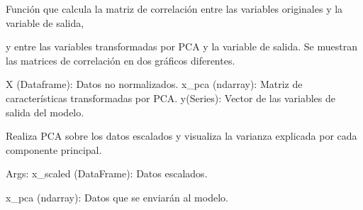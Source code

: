 \documentclass[letterpaper,10pt,spanish]{sphinxmanual}
\begin{document}
\label{\detokenize{Funciones_Visualizacion:module-Matriz_correlacion}}

\begin{fulllineitems}
\label{\detokenize{Funciones_Visualizacion:Matriz_correlacion.Variables_correlacion}}
\pysigstartsignatures
\pysiglinewithargsret
{}
{\sphinxparamcomma {}\sphinxparamcomma {}}
{}
\pysigstopsignatures
\sphinxAtStartPar
Función que calcula la matriz de correlación entre las variables originales y la variable de salida,

\sphinxAtStartPar
y entre las variables transformadas por PCA y la variable de salida.
Se muestran las matrices de correlación en dos gráficos diferentes.
\begin{description}
\sphinxAtStartPar
X (Dataframe): Datos no normalizados.
x\_pca (ndarray): Matriz de características transformadas por PCA.
y(Series): Vector de las variables de salida del modelo.

\end{description}

\end{fulllineitems}

\label{\detokenize{Funciones_Visualizacion:module-Principales_caracteristicas}}

\begin{fulllineitems}
\label{\detokenize{Funciones_Visualizacion:Principales_caracteristicas.pca}}
\pysigstartsignatures
\pysiglinewithargsret
{}
{}
{}
\pysigstopsignatures
\sphinxAtStartPar
Realiza PCA sobre los datos escalados y visualiza la varianza explicada por cada componente principal.

\sphinxAtStartPar
Args:
x\_scaled (DataFrame): Datos escalados.
\begin{description}
\sphinxAtStartPar
x\_pca (ndarray): Datos que se enviarán al modelo.

\end{description}

\end{fulllineitems}
\end{document}
